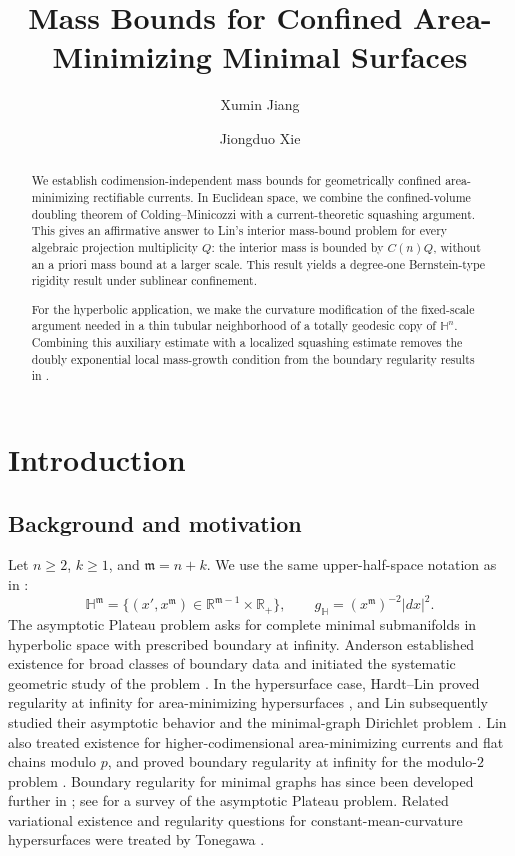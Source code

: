 \documentclass[11pt,reqno]{amsart}
\title[Mass bounds for confined area-minimizing minimal surfaces]
{Mass Bounds for Confined Area-Minimizing Minimal Surfaces}
\author{Xumin Jiang}
\author{Jiongduo Xie}
\numberwithin{equation}{section}
\theoremstyle{definition}
\theoremstyle{remark}
\newcommand{\Hyp}{\mathbb H}
\newcommand{\R}{\mathbb R}
\begin{document}
\begin{abstract}
We establish codimension-independent mass bounds for geometrically confined
area-minimizing rectifiable currents.   In Euclidean
space, we combine the confined-volume doubling theorem of
Colding--Minicozzi with a current-theoretic squashing argument.  This gives an
affirmative answer to Lin's interior mass-bound problem for every algebraic
projection multiplicity $Q$: the interior mass is bounded by $C(n)Q$, without
an a priori mass bound at a larger scale. This result  yields a degree‑one Bernstein‑type rigidity result under sublinear confinement.


For the hyperbolic application, we make the curvature modification of the
fixed-scale argument needed in a thin tubular neighborhood of a totally
geodesic copy of $\Hyp^n$.  Combining this auxiliary
estimate with a localized squashing estimate removes the doubly exponential
local mass-growth condition from the boundary regularity  results in \cite{JiangXie}.
\end{abstract}

\maketitle

\section{Introduction}\label{sec:introduction}

\subsection{Background and motivation}

Let $n\ge2$, $k\ge1$, and $\mathfrak m=n+k$.  We use the same upper-half-space
notation as in \cite{JiangXie}:
\[
 \Hyp^{\mathfrak m}
 =\{(x',x^{\mathfrak m})\in\R^{\mathfrak m-1}\times\R_+\},
 \qquad
 g_{\Hyp}=(x^{\mathfrak m})^{-2}|dx|^2.
\]
The asymptotic Plateau problem asks for complete minimal submanifolds in
hyperbolic space with prescribed boundary at infinity.  Anderson established
existence for broad classes of boundary data and initiated the systematic
geometric study of the problem \cite{Anderson1982,Anderson1983}.  In the
hypersurface case, Hardt--Lin proved regularity at infinity for
area-minimizing hypersurfaces \cite{HardtLin}, and Lin subsequently studied
their asymptotic behavior and the minimal-graph Dirichlet problem
\cite{LinAsymptotic,LinDirichlet,LinErratum}.  Lin also treated existence for
higher-codimensional area-minimizing currents and flat chains modulo $p$, and
proved boundary regularity at infinity for the modulo-$2$ problem
\cite{LinAsymptotic}.  Boundary regularity for
minimal graphs has since been developed further in
\cite{HanShenWang,HanJiang,HanWang}; see \cite{CoskunuzerSurvey} for a survey
of the asymptotic Plateau problem.  Related variational existence and
regularity questions for constant-mean-curvature hypersurfaces were treated
by Tonegawa \cite{Tonegawa}.
\end{document}
